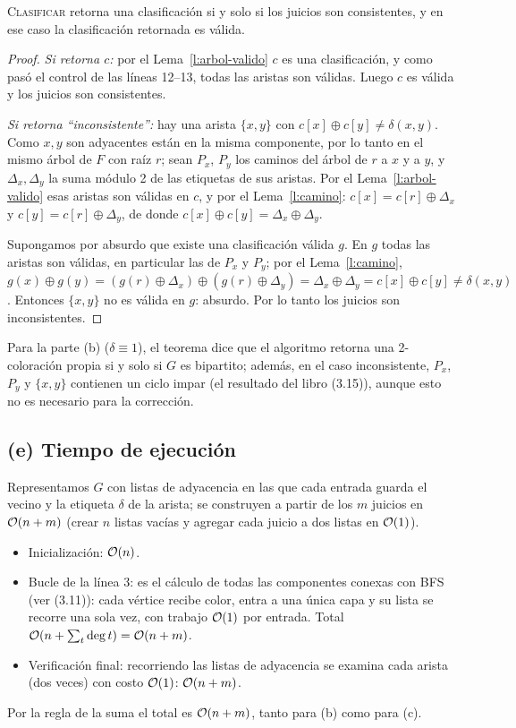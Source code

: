 \begin{teorema}
\textsc{Clasificar} retorna una clasificación si y solo si los juicios son consistentes, y en ese caso
la clasificación retornada es válida.
\end{teorema}
\begin{proof}
\emph{Si retorna $c$:} por el Lema~\ref{l:arbol-valido} $c$ es una clasificación, y como pasó el control de
las líneas 12--13, todas las aristas son válidas. Luego $c$ es válida y los juicios son consistentes.

\emph{Si retorna ``inconsistente'':} hay una arista $\{x,y\}$ con $c[x]\oplus c[y]\neq\delta(x,y)$.
Como $x,y$ son adyacentes están en la misma componente, por lo tanto en el mismo árbol de $F$ con raíz
$r$; sean $P_x$, $P_y$ los caminos del árbol de $r$ a $x$ y a $y$, y $\Delta_x,\Delta_y$ la suma módulo
2 de las etiquetas de sus aristas. Por el Lema~\ref{l:arbol-valido} esas aristas son válidas en $c$, y
por el Lema~\ref{l:camino}: $c[x]=c[r]\oplus\Delta_x$ y $c[y]=c[r]\oplus\Delta_y$, de donde
$c[x]\oplus c[y]=\Delta_x\oplus\Delta_y$.

Supongamos por absurdo que existe una clasificación válida $g$. En $g$ todas las aristas son válidas,
en particular las de $P_x$ y $P_y$; por el Lema~\ref{l:camino}, $g(x)\oplus g(y)=(g(r)\oplus\Delta_x)
\oplus(g(r)\oplus\Delta_y)=\Delta_x\oplus\Delta_y=c[x]\oplus c[y]\neq\delta(x,y)$. Entonces $\{x,y\}$
no es válida en $g$: absurdo. Por lo tanto los juicios son inconsistentes.
\end{proof}
Para la parte (b) ($\delta\equiv1$), el teorema dice que el algoritmo retorna una 2-coloración
propia si y solo si $G$ es bipartito; además, en el caso inconsistente, $P_x$, $P_y$ y $\{x,y\}$
contienen un ciclo impar (el resultado del libro (3.15)), aunque esto no es necesario para la
corrección.

\subsection*{(e) Tiempo de ejecución}
Representamos $G$ con listas de adyacencia en las que cada entrada guarda el vecino y la etiqueta
$\delta$ de la arista; se construyen a partir de los $m$ juicios en $\mathcal{O}(n+m)$ (crear $n$ listas vacías y
agregar cada juicio a dos listas en $\mathcal{O}(1)$).
\begin{itemize}[nosep]
\item Inicialización: $\mathcal{O}(n)$.
\item Bucle de la línea 3: es el cálculo de todas las componentes conexas con BFS (ver (3.11)): cada vértice
recibe color, entra a una única capa y su lista se recorre una sola vez, con trabajo $\mathcal{O}(1)$ por
entrada. Total $\mathcal{O}(n+\sum_t\deg t)=\mathcal{O}(n+m)$.
\item Verificación final: recorriendo las listas de adyacencia se examina cada arista (dos veces) con
costo $\mathcal{O}(1)$: $\mathcal{O}(n+m)$.
\end{itemize}
Por la regla de la suma el total es $\mathcal{O}(n+m)$, tanto para (b) como para (c).

